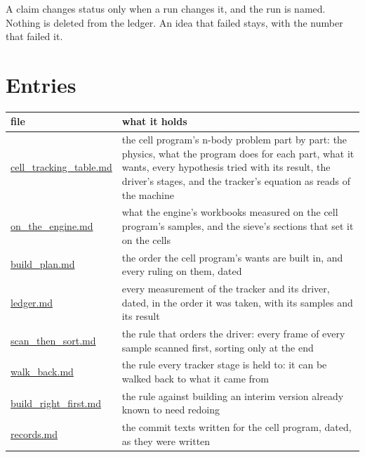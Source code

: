 A claim changes status only when a run changes it, and the run is named. Nothing is deleted from the ledger. An idea that failed stays, with the number that failed it.

\section{\texorpdfstring{Entries}{Entries}}

{\small
\setlength{\tabcolsep}{6pt}
\begin{longtable}{>{\RaggedRight\arraybackslash}p{}>{\RaggedRight\arraybackslash}p{}}
\toprule
file & what it holds \\
\midrule
\endhead
\hyperref[chap:cell-tracking-table]{cell\_\allowbreak{}tracking\_\allowbreak{}table.md} & the cell program's n-body problem part by part: the physics, what the program does for each part, what it wants, every hypothesis tried with its result, the driver's stages, and the tracker's equation as reads of the machine \\
\hyperref[chap:on-the-engine]{on\_\allowbreak{}the\_\allowbreak{}engine.md} & what the engine's workbooks measured on the cell program's samples, and the sieve's sections that set it on the cells \\
\hyperref[chap:build-plan]{build\_\allowbreak{}plan.md} & the order the cell program's wants are built in, and every ruling on them, dated \\
\hyperref[chap:ledger]{ledger.md} & every measurement of the tracker and its driver, dated, in the order it was taken, with its samples and its result \\
\hyperref[chap:scan-then-sort]{scan\_\allowbreak{}then\_\allowbreak{}sort.md} & the rule that orders the driver: every frame of every sample scanned first, sorting only at the end \\
\hyperref[chap:walk-back]{walk\_\allowbreak{}back.md} & the rule every tracker stage is held to: it can be walked back to what it came from \\
\hyperref[chap:build-right-first]{build\_\allowbreak{}right\_\allowbreak{}first.md} & the rule against building an interim version already known to need redoing \\
\hyperref[chap:records]{records.md} & the commit texts written for the cell program, dated, as they were written \\
\bottomrule
\end{longtable}
}
